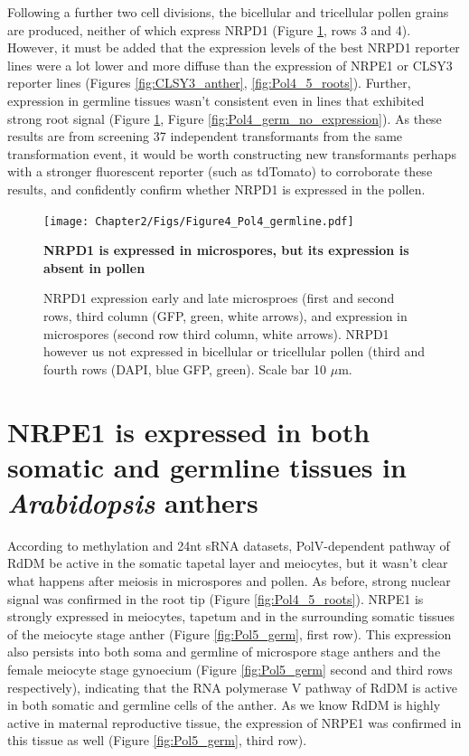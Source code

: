 Following a further two cell divisions, the bicellular and tricellular pollen grains are produced, neither of which express NRPD1 (Figure \ref{fig:Pol4_germ}, rows 3 and 4). However, it must be added that the expression levels of the best NRPD1 reporter lines were a lot lower and more diffuse than the expression of NRPE1 or CLSY3 reporter lines (Figures \ref{fig:CLSY3_anther}, \ref{fig:Pol4_5_roots}). Further, expression in germline tissues wasn't consistent even in lines that exhibited strong root signal (Figure \ref{fig:Pol4_germ}, Figure \ref{fig:Pol4_germ_no_expression}). As these results are from screening 37 independent transformants from the same transformation event, it would be worth constructing new transformants perhaps with a stronger fluorescent reporter (such as tdTomato) to corroborate these results, and confidently confirm whether NRPD1 is expressed in the pollen. 


\begin{figure}[htbp!] 
\centering    
    \texttt{[image: Chapter2/Figs/Figure4\_Pol4\_germline.pdf]}
\caption{\textbf{NRPD1 is expressed in microspores, but its expression is absent in pollen}}
\label{fig:Pol4_germ}
\captionsetup{font=small}
    \caption*{NRPD1 expression early and late microsproes (first and second rows, third column (GFP, green, white arrows), and expression in microspores (second row third column, white arrows). NRPD1 however us not expressed in bicellular or tricellular pollen (third and fourth rows (DAPI, blue GFP, green). Scale bar 10 $\mu$m.}
\end{figure}

\section{NRPE1 is expressed in both somatic and germline tissues in \textit{Arabidopsis} anthers}

According to methylation and 24nt sRNA datasets,  PolV-dependent pathway of RdDM be active in the somatic tapetal layer and meiocytes, but it wasn't clear what happens after meiosis in microspores and pollen. As before, strong nuclear signal was confirmed in the root tip (Figure \ref{fig:Pol4_5_roots}).  NRPE1 is strongly expressed in meiocytes, tapetum and in the surrounding somatic tissues of the meiocyte stage anther (Figure \ref{fig:Pol5_germ}, first row). This expression also persists into both soma and germline of microspore stage anthers and the female meiocyte stage gynoecium (Figure \ref{fig:Pol5_germ} second and third rows respectively), indicating that the RNA polymerase V pathway of RdDM is active in both somatic and germline cells of the anther. As we know RdDM is highly active in maternal reproductive tissue, the expression of NRPE1 was confirmed in this tissue as well (Figure \ref{fig:Pol5_germ}, third row).

